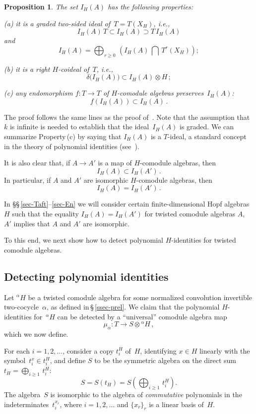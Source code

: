 \documentclass[11pt, a4paper]{amsart}
\newtheorem{prop}[theorem]{Proposition}
\theoremstyle{definition}
\numberwithin{equation}{section}
\begin{document}
\begin{prop}
The set $I_H(A)$ has the following properties:

(a) it is a graded two-sided ideal of~$T = T(X_H)$, i.e.,
\[
I_H(A) \, T \subset I_H(A) \supset T \, I_H(A)
\]
and
\[
I_H(A) = \bigoplus_{r\geq 0} \,  \left( I_H(A) \, \bigcap \, T^r(X_H) \right)  ;
\]

(b) it is a right $H$-coideal of~$T$, i.e.,
\[
\delta\bigl(I_H(A)\bigr) \subset I_H(A) \otimes H \, ;
\]

(c) any endomorphism $f: T \to T$ of $H$-comodule algebras preserves~$I_H(A)$:
\[
f \left( I_H(A) \right) \subset I_H(A) \, .
\]
\end{prop}

The proof follows the same lines as the proof of~\cite[Prop.~2.2]{AK}. 
Note that the assumption that $k$ is infinite is needed to establish that the ideal~$I_H(A)$ is graded.
We can summarize Property\,(c) by saying that $I_H(A)$ is a $T$-ideal, 
a standard concept in the theory of polynomial identities (see~\cite{Ro}).

It is also clear that, if $A \to A'$ is a map of $H$-comodule algebras, then 
\[
I_H(A) \subset I_H(A') \, .
\]
In particular, if $A$ and $A'$ are isomorphic $H$-comodule algebras, then 
\[
I_H(A) = I_H(A') \, .
\]

In \S\S\,\ref{sec-Taft}--\ref{sec-En} we will consider certain finite-dimensional Hopf algebras~$H$ such that 
the equality $I_H(A) = I_H(A')$ for twisted comodule algebras $A$, $A'$
implies that $A$ and $A'$ are isomorphic.

To this end, we next show how to detect polynomial $H$-identities for twisted comodule algebras.

\subsection{Detecting polynomial identities}\label{ssec-detect}

Let ${}^{\alpha} H$ be a twisted comodule algebra for some normalized convolution invertible two-cocycle~$\alpha$,
as defined in\,\S\,\ref{ssec-prel}. 
We claim that the polynomial $H$-identities for~${}^{\alpha} H$ can be detected 
by a ``universal'' comodule algebra map
\[
\mu_{\alpha}: T \to S \otimes {}^{\alpha} H \, ,
\]
which we now define.

For each $i= 1,2, \ldots$, consider a copy $t_i^H$ of~$H$, identifying $x\in H$ linearly with the symbol~$t_i^x \in t_i^H$,
and define $S$ to be the symmetric algebra on the direct sum $t_H = \bigoplus_{i\geq 1} \, t_i^H$:
\[
S = S(t_H) = S \left(\bigoplus_{i\geq 1} \, t_i^H \right) .
\]
The algebra~$S$ is isomorphic to the algebra of \emph{commutative} polynomials in the indeterminates~$t_i^{x_r}$,
where $i = 1, 2, \ldots$ and $\{x_r\}_r$ is a linear basis of~$H$.
\end{document}
